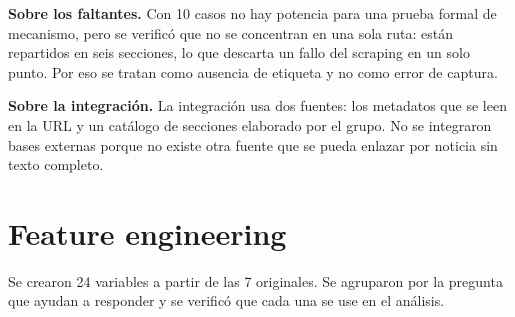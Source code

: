 \documentclass[12pt,a4paper]{article}
\begin{document}
\textbf{Sobre los faltantes.} Con 10 casos no hay potencia para una prueba formal de mecanismo, pero se verificó que no se concentran en una sola ruta: están repartidos en seis secciones, lo que descarta un fallo del scraping en un solo punto. Por eso se tratan como ausencia de etiqueta y no como error de captura.

\textbf{Sobre la integración.} La integración usa dos fuentes: los metadatos que se leen en la URL y un catálogo de secciones elaborado por el grupo. No se integraron bases externas porque no existe otra fuente que se pueda enlazar por noticia sin texto completo.

\section{Feature engineering}
Se crearon 24 variables a partir de las 7 originales. Se agruparon por la pregunta que ayudan a responder y se verificó que cada una se use en el análisis.
\end{document}
